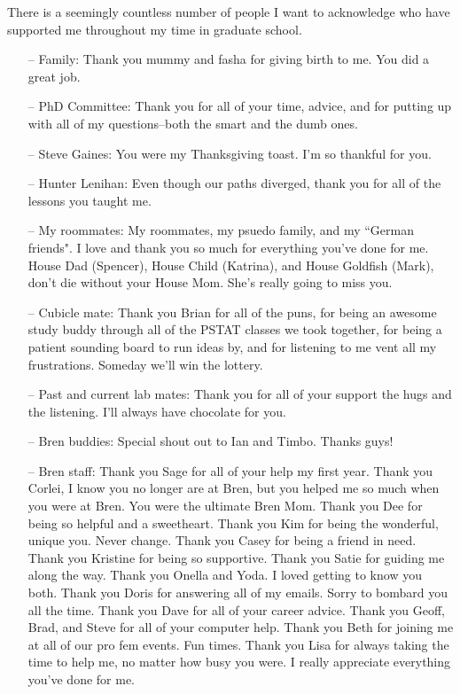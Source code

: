 \begin{acknowledgements}

There is a seemingly countless number of people I want to acknowledge who have supported me throughout my time in graduate school. 

\vspace{-\topsep}
\begin{itemize}
\setlength{\parskip}{0pt}
 \setlength{\itemsep}{0pt plus 1pt}
\item[--] Family: Thank you mummy and fasha for giving birth to me. You did a great job.
\item[--] PhD Committee: Thank you for all of your time, advice, and for putting up with all of my questions--both the smart and the dumb ones.
\item[--] Steve Gaines: You were my Thanksgiving toast. I'm so thankful for you.
\item[--] Hunter Lenihan: Even though our paths diverged, thank you for all of the lessons you taught me.
\item[--] My roommates: My roommates, my psuedo family, and my ``German friends". I love and thank you so much for everything you've done for me. House Dad (Spencer), House Child (Katrina), and House Goldfish (Mark), don't die without your House Mom. She's really going to miss you.
\item[--] Cubicle mate: Thank you Brian for all of the puns, for being an awesome study buddy through all of the PSTAT classes we took together, for being a patient sounding board to run ideas by, and for listening to me vent all my frustrations. Someday we'll win the lottery.
\item[--] Past and current lab mates: Thank you for all of your support the hugs and the listening. I'll always have chocolate for you.
\item[--] Bren buddies: Special shout out to Ian and Timbo. Thanks guys!
\item[--] Bren staff: Thank you Sage for all of your help my first year. Thank you Corlei, I know you no longer are at Bren, but you helped me so much when you were at Bren. You were the ultimate Bren Mom. Thank you Dee for being so helpful and a sweetheart. Thank you Kim for being the wonderful, unique you. Never change. Thank you Casey for being a friend in need. Thank you Kristine for being so supportive. Thank you Satie for guiding me along the way. Thank you Onella and Yoda. I loved getting to know you both. Thank you Doris for answering all of my emails. Sorry to bombard you all the time. Thank you Dave for all of your career advice. Thank you Geoff, Brad, and Steve for all of your computer help. Thank you Beth for joining me at all of our pro fem events. Fun times. Thank you Lisa for always taking the time to help me, no matter how busy you were. I really appreciate everything you've done for me.

\end{itemize}
\end{acknowledgements}
